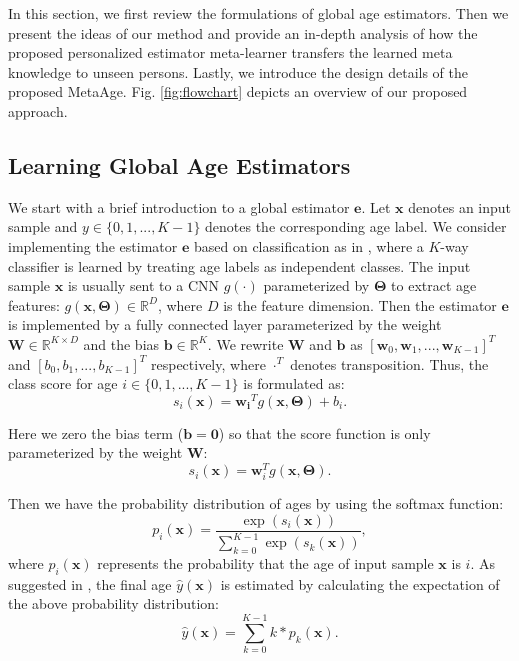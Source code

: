 \documentclass[journal,twoside]{IEEEtran}
\begin{document}
In this section, we first review the formulations of global age estimators. Then we present the ideas of our method and provide an in-depth analysis of how the proposed personalized estimator meta-learner transfers the learned meta knowledge to unseen persons. Lastly, we introduce the design details of the proposed MetaAge. Fig. \ref{fig:flowchart} depicts an overview of our proposed approach.



\subsection{Learning Global Age Estimators}
We start with a brief introduction to a global estimator $\bm{e}$. Let $\bm{x}$ denotes an input sample and $y \in \{0, 1, ..., K-1\}$ denotes the corresponding age label. We consider implementing  the estimator $\bm{e}$ based on classification as in \cite{rothe2018deep}, where a $K$-way classifier is learned by treating age labels as independent classes. The input sample $\bm{x}$  is usually sent to a CNN $g(\cdot)$ parameterized by  $\bm{\Theta}$ to extract age features: $g(\bm{x}, \bm{\Theta}) \in \mathbb{R}^D$, where $D$ is the feature dimension. Then the estimator $\bm{e}$ is implemented by a fully connected layer parameterized by the weight $\bm{W} \in \mathbb{R}^{K \times D}$ and the bias $\bm{b} \in \mathbb{R}^{K}$. We rewrite $\bm{W}$ and $\bm{b}$  as $[\bm{w}_0, \bm{w}_1, ..., \bm{w}_{K-1}]^T$ and  $[b_0, b_1, ..., b_{K-1}]^T$ respectively, where $\cdot ^T$ denotes transposition. Thus, the class score for age $i \in \{0, 1, ..., K-1\}$ is formulated as:
\begin{equation}
s_i(\bm{x}) =  \bm{w_i}^T g(\bm{x},\bm{\Theta}) + b_i.
\label{equ:commonscorewithb}
\end{equation}

Here we zero the bias term ($\bm{b} = \bm{0}$) so that the score function is only parameterized by the weight $\bm{W}$:
\begin{equation}
s_i(\bm{x}) =  \bm{w}_i^T g(\bm{x},\bm{\Theta}).
\label{equ:commonscore}
\end{equation}

Then we have the probability distribution of ages by  using the softmax function:
\begin{equation}
p_i(\bm{x}) = \frac{\exp(s_i(\bm{x}))}{\sum_{k=0}^{K-1} \exp(s_k(\bm{x}))},
\label{equ:softmax}
\end{equation}
where $p_i(\bm{x})$ represents the probability that the age of input sample $\bm{x}$ is $i$.
As suggested in \cite{rothe2018deep}, the final age $\hat{y}(\bm{x})$ is  estimated by calculating the expectation of the above
 probability distribution:
\begin{equation}
\hat{y}(\bm{x}) =\sum_{k=0}^{K-1} k * p_k(\bm{x}).
\label{equ:expectation}
\end{equation}
\end{document}
